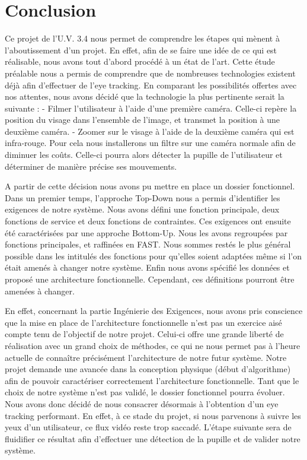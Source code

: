 \chapter{Conclusion}


Ce projet de l'U.V. 3.4 nous permet de comprendre les étapes qui mènent à l'aboutissement d'un projet. En effet, afin de se faire une idée de ce qui est réalisable, nous avons tout d'abord procédé à un état de l'art. Cette étude préalable nous a permis de comprendre que de nombreuses technologies existent déjà afin d'effectuer de l'eye tracking. En comparant les possibilités offertes avec nos attentes, nous avons décidé que la technologie la plus pertinente serait la suivante :
- Filmer l'utilisateur à l'aide d'une première caméra. Celle-ci repère la position du visage dans l'ensemble de l'image, et transmet la position à une deuxième caméra.
- Zoomer sur le visage à l'aide de la deuxième caméra qui est infra-rouge. Pour cela nous installerons  un filtre sur une caméra normale afin de diminuer les coûts. Celle-ci pourra alors détecter la pupille de l'utilisateur et déterminer de manière précise ses mouvements.

\vspace*{1cm}

A partir de cette décision nous avons pu mettre en place un dossier fonctionnel. Dans un premier temps, l'approche Top-Down nous a permis d'identifier les exigences de notre système. Nous avons défini une fonction  principale, deux fonctions de service et deux fonctions de contraintes. Ces exigences ont ensuite été caractérisées par une approche Bottom-Up. Nous les avons regroupées par fonctions principales, et raffinées en FAST. Nous sommes restés le plus général possible dans les intitulés des fonctions pour qu'elles soient adaptées même si l'on était amenés à changer notre système. Enfin nous avons spécifié les données et proposé une architecture fonctionnelle. Cependant, ces définitions pourront être amenées à changer.

\vspace*{1cm}

En effet, concernant la partie Ingénierie des Exigences, nous avons pris conscience que la mise en place de l'architecture fonctionnelle n'est pas un exercice aisé compte tenu de l'objectif de notre projet. Celui-ci offre une grande liberté de réalisation avec un grand choix de méthodes, ce qui ne nous permet pas à l'heure actuelle de connaître précisément l'architecture de notre futur système. Notre projet demande une avancée dans la conception physique (début d'algorithme) afin de pouvoir caractériser correctement l'architecture fonctionnelle. Tant que le choix de notre système n'est pas validé, le dossier fonctionnel pourra évoluer. Nous avons donc décidé de nous consacrer désormais à l'obtention d'un eye tracking performant. En effet, à ce stade du projet, si nous parvenons à suivre les yeux d'un utilisateur, ce flux vidéo reste trop saccadé. L'étape suivante sera de fluidifier ce résultat afin d'effectuer une détection de la pupille et de valider notre système.

